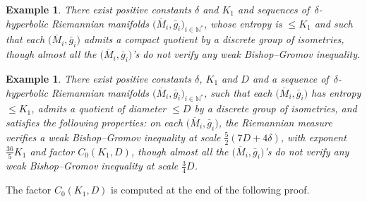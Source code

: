 \documentclass[10pt,a4paper]{amsart}
\numberwithin{equation}{section}
\newtheorem{exa}[theor]{Example}
\newcommand{\N}{\mathbb{N}}
\begin{document}
\begin{exa}\label{nonBishopbis} There exist positive constants $\delta$ and $K_1$ and sequences of~$\delta$-hyperbolic
Riemannian manifolds $\big(\overline M_i, \bar g_i\big)_{i \in \N^*}$, whose entropy is $ \le K_1$ and such that each $\big(\overline M_i, \bar g_i\big)$
admits a compact quotient by a discrete group of isometries, though almost all the $\big(\overline M_i, \bar g_i\big)$'s do not verify any weak
Bishop--Gromov inequality.
\end{exa}

\begin{exa}\label{nonBishop} There exist positive constants $\delta$, $K_1$ and $D$ and a sequence of~$\delta$-hyperbolic
Riemannian manifolds $\big(\overline M_i, \bar g_i\big)_{i \in \N^*}$, such that each $\big(\overline M_i, \bar g_i\big)$ has entropy $\le K_1$,
admits a quotient of diameter $\le D$ by a discrete group of isometries, and satisfies the following properties: on each $\big(\overline M_i, \bar g_i\big)$, the
Riemannian measure verifies a weak Bishop--Gromov inequality at scale
$\frac{5}{2} (7 D + 4 \delta)$, with exponent $\frac{36}{5} K_1$ and factor $C_0 (K_1, D)$, though almost all the $\big(\overline M_i, \bar g_i\big)$'s do not verify
any weak Bishop--Gromov inequality at scale $ \frac{3}{4} D$.
\end{exa}

The factor $C_0 (K_1, D)$ is computed at the end of the following proof.
\end{document}
